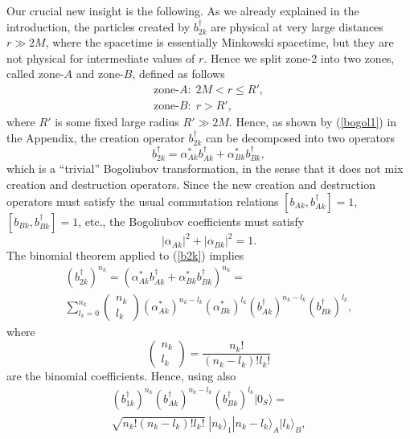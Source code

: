 \documentclass[12pt]{article}
\begin{document}
Our crucial new insight is the following. As we already explained in the introduction,
the particles created by $b_{2k}^\dagger$ are physical at very large distances $r\gg 2M$, 
where the spacetime is essentially Minkowski spacetime, but they are not physical for intermediate values of $r$.
Hence we split zone-2 into two zones, called zone-$A$ and zone-$B$, defined as follows
\begin{equation}
\begin{array}{l}
 \text{zone-}A: \; 2M<r\le R', 
\\
 \text{zone-}B: \; r>R', 
\end{array}
\end{equation}
where $R'$ is some fixed large radius $R'\gg 2M$. Hence, as shown by (\ref{bogol1}) in the Appendix, 
the creation operator $b_{2k}^\dagger$ can be decomposed into two operators 
\begin{equation}\label{b2k}
 b_{2k}^\dagger=\alpha_{Ak}^*b_{Ak}^\dagger + \alpha_{Bk}^*b_{Bk}^\dagger ,
\end{equation}
which is a ``trivial'' Bogoliubov transformation, in the sense that it does not mix creation and destruction operators.
Since the new creation and destruction operators must satisfy the usual commutation relations 
$[b_{Ak}, b_{Ak}^\dagger]=1$, $[b_{Bk}, b_{Bk}^\dagger]=1$, etc., the Bogoliubov coefficients must satisfy
\begin{equation}\label{sum_alpha=1}
 |\alpha_{Ak}|^2+|\alpha_{Bk}|^2 =1. 
\end{equation}
The binomial theorem applied to (\ref{b2k}) implies
\begin{eqnarray}
 &  (b_{2k}^\dagger)^{n_k}  = (\alpha_{Ak}^*b_{Ak}^\dagger + \alpha_{Bk}^*b_{Bk}^\dagger)^{n_k} =&
\\
& \displaystyle\sum_{l_k=0}^{n_k} \left( \begin{array}{c} n_k \\ l_k \end{array} \right) 
(\alpha_{Ak}^*)^{n_k-l_k} (\alpha_{Bk}^*)^{l_k}  (b_{Ak}^\dagger)^{n_k-l_k}  (b_{Bk}^\dagger)^{l_k} ,
\nonumber
\end{eqnarray}
where 
\begin{equation}
 \left( \begin{array}{c} n_k \\ l_k \end{array} \right) =\frac{n_k!}{(n_k-l_k)!l_k!}
\end{equation}
are the binomial coefficients. Hence, using also 
\begin{eqnarray}
& (b_{1k}^\dagger)^{n_k} (b_{Ak}^\dagger)^{n_k-l_k} (b_{Bk}^\dagger)^{l_k} |0_S\rangle = &
\nonumber \\
&\sqrt{n_k! (n_k-l_k)! l_k!}\; |n_k\rangle_1 |n_k-l_k\rangle_A |l_k\rangle_B , &
\end{eqnarray}
\end{document}
